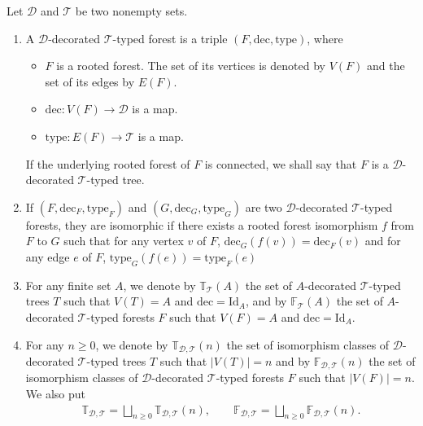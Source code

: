 \documentclass[pdftex]{sigma}
\numberwithin{equation}{section}
\newcommand{\T}{\mathcal{T}}
\newcommand{\D}{\mathcal{D}}
\newcommand{\bfT}{\mathbb{T}}
\newcommand{\bfF}{\mathbb{F}}
\newcommand{\dec}{\mathrm{dec}}
\newcommand{\id}{\mathrm{Id}}
\newcommand{\type}{\mathrm{type}}
\begin{document}
\begin{Definition}
Let $\D$ and $\T$ be two nonempty sets.
\begin{enumerate}\itemsep=0pt
\item A $\D$-decorated $\T$-typed forest is a triple $(F,\dec,\type)$, where
\begin{itemize}\itemsep=0pt
\item $F$ is a rooted forest. The set of its vertices is denoted by $V(F)$ and the set of its edges by $E(F)$.
\item $\dec\colon V(F)\longrightarrow \D$ is a map.
\item $\type\colon E(F)\longrightarrow \T$ is a map.
\end{itemize}
If the underlying rooted forest of $F$ is connected, we shall say that $F$ is a $\D$-decorated $\T$-typed tree.
\item If $(F,\dec_F,\type_F)$ and $(G,\dec_G,\type_G)$ are two $\D$-decorated $\T$-typed forests,
they are isomorphic if there exists a rooted forest isomorphism $f$ from $F$ to $G$ such that for any vertex $v$ of $F$,
$\dec_G(f(v))=\dec_F(v)$ and for any edge $e$ of $F$, $\type_G(f(e))=\type_F(e)$
\item For any finite set $A$, we denote by $\bfT_\T(A)$ the set of $A$-decorated
$\T$-typed trees $T$ such that $V(T)=A$
and $\dec=\id_A$, and by $\bfF_\T(A)$ the set of $A$-decorated $\T$-typed forests $F$ such that $V(F)=A$ and $\dec=\id_A$.
\item For any $n\geq 0$, we denote by $\bfT_{\D,\T}(n)$ the set of isomorphism classes of $\D$-decorated $\T$-typed trees $T$
such that $|V(T)|=n$ and by $\bfF_{\D,\T}(n)$ the set of isomorphism classes of $\D$-decorated $\T$-typed forests $F$
such that $|V(F)|=n$.
We also put
\begin{gather*}
\bfT_{\D,\T}=\bigsqcup_{n\geq 0} \bfT_{\D,\T}(n),\qquad
\bfF_{\D,\T}=\bigsqcup_{n\geq 0} \bfF_{\D,\T}(n).
\end{gather*}
\end{enumerate}
\end{Definition}
\end{document}
